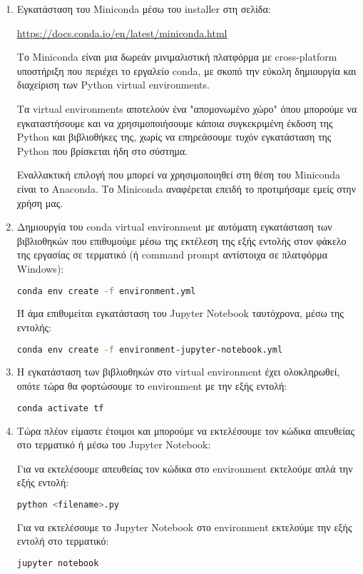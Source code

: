 \documentclass[12pt,a4paper]{article}
\begin{document}
\begin{enumerate}
    \item Εγκατάσταση του Miniconda μέσω του installer στη σελίδα:

        \textcolor{blue}{\href{https://docs.conda.io/en/latest/miniconda.html}{https://docs.conda.io/en/latest/miniconda.html}}

         Το Miniconda είναι μια δωρεάν μινιμαλιστική πλατφόρμα με cross-platform υποστήριξη που περιέχει το εργαλείο conda, με σκοπό την εύκολη δημιουργία και διαχείριση των Python virtual environments.

         Τα virtual environments αποτελούν ένα "απομονωμένο χώρο" όπου μπορούμε να εγκαταστήσουμε και να χρησιμοποιήσουμε κάποια συγκεκριμένη έκδοση της Python και βιβλιοθήκες της, χωρίς να επηρεάσουμε τυχόν εγκατάσταση της Python που βρίσκεται ήδη στο σύστημα. 

         Εναλλακτική επιλογή που μπορεί να χρησιμοποιηθεί στη θέση του Miniconda είναι το Anaconda. Το Miniconda αναφέρεται επειδή το προτιμήσαμε εμείς στην χρήση μας.

     \item Δημιουργία του conda virtual environment με αυτόματη εγκατάσταση των βιβλιοθηκών που επιθυμούμε μέσω της εκτέλεση της εξής εντολής στον φάκελο της εργασίας σε τερματικό (ή command prompt αντίστοιχα σε πλατφόρμα Windows):

         \begin{lstlisting}[language=Bash]
conda env create -f environment.yml\end{lstlisting}

         Ή άμα επιθυμείται εγκατάσταση του Jupyter Notebook ταυτόχρονα, μέσω της εντολής:

         \begin{lstlisting}[language=Bash]
conda env create -f environment-jupyter-notebook.yml\end{lstlisting}
     \item Η εγκατάσταση των βιβλιοθηκών στο virtual environment έχει ολοκληρωθεί, οπότε τώρα θα φορτώσουμε το environment με την εξής εντολή:
         \begin{lstlisting}[language=Bash]
conda activate tf\end{lstlisting}
    \item Τώρα πλέον είμαστε έτοιμοι και μπορούμε να εκτελέσουμε τον κώδικα απευθείας στο τερματικό ή μέσω του Jupyter Notebook:

        Για να εκτελέσουμε απευθείας τον κώδικα στο environment εκτελούμε απλά την εξής εντολή:
         \begin{lstlisting}[language=Bash]
python <filename>.py\end{lstlisting}

        Για να εκτελέσουμε το Jupyter Notebook στο environment εκτελούμε την εξής εντολή στο τερματικό:
         \begin{lstlisting}[language=Bash]
jupyter notebook\end{lstlisting}

\end{enumerate}
\end{document}

